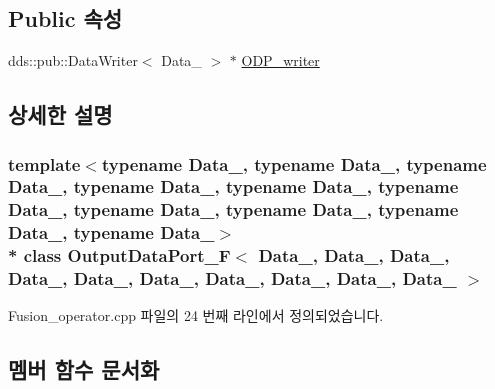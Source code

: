 \subsection*{Public 속성}
\begin{DoxyCompactItemize}
\item 
dds\+::pub\+::\+Data\+Writer$<$ Data\+\_ $>$ $\ast$ \hyperlink{classOutputDataPort__F_a269553e496d1229e4f88e6449a2bce8e}{O\+D\+P\+\_\+writer}
\end{DoxyCompactItemize}


\subsection{상세한 설명}
\subsubsection*{template$<$typename Data\+\_, typename Data\+\_, typename Data\+\_, typename Data\+\_, typename Data\+\_, typename Data\+\_, typename Data\+\_, typename Data\+\_, typename Data\+\_, typename Data\+\_$>$\\*
class Output\+Data\+Port\+\_\+\+F$<$ Data\+\_, Data\+\_, Data\+\_, Data\+\_, Data\+\_, Data\+\_, Data\+\_, Data\+\_, Data\+\_, Data\+\_ $>$}



Fusion\+\_\+operator.\+cpp 파일의 24 번째 라인에서 정의되었습니다.



\subsection{멤버 함수 문서화}
